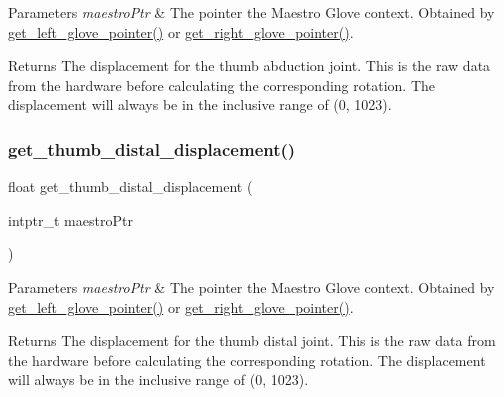 \begin{DoxyParams}{Parameters}
{\em maestro\+Ptr} & The pointer the Maestro Glove context. Obtained by \hyperlink{group__glove_management_ga63ce3c99d4a8b8db851b22af9185764e}{get\+\_\+left\+\_\+glove\+\_\+pointer()} or \hyperlink{group__glove_management_ga9b8fd9d91aeac3f8da50f7a7eba0c32b}{get\+\_\+right\+\_\+glove\+\_\+pointer()}. \\
\hline
\end{DoxyParams}
\begin{DoxyReturn}{Returns}
The displacement for the thumb abduction joint. This is the raw data from the hardware before calculating the corresponding rotation. The displacement will always be in the inclusive range of (0, 1023). 
\end{DoxyReturn}
\mbox{\label{group__displacement_access_gaf094ab423a9858746786b6a984ec031f}} 
\subsubsection{\texorpdfstring{get\+\_\+thumb\+\_\+distal\+\_\+displacement()}{get\_thumb\_distal\_displacement()}}
{\footnotesize\ttfamily float get\+\_\+thumb\+\_\+distal\+\_\+displacement (\begin{DoxyParamCaption}\item[{intptr\+\_\+t}]{maestro\+Ptr }\end{DoxyParamCaption})}


\begin{DoxyParams}{Parameters}
{\em maestro\+Ptr} & The pointer the Maestro Glove context. Obtained by \hyperlink{group__glove_management_ga63ce3c99d4a8b8db851b22af9185764e}{get\+\_\+left\+\_\+glove\+\_\+pointer()} or \hyperlink{group__glove_management_ga9b8fd9d91aeac3f8da50f7a7eba0c32b}{get\+\_\+right\+\_\+glove\+\_\+pointer()}. \\
\hline
\end{DoxyParams}
\begin{DoxyReturn}{Returns}
The displacement for the thumb distal joint. This is the raw data from the hardware before calculating the corresponding rotation. The displacement will always be in the inclusive range of (0, 1023). 
\end{DoxyReturn}
\mbox{\label{group__displacement_access_ga86d0adfde28a3008a21fb4620e4b93df}} 
